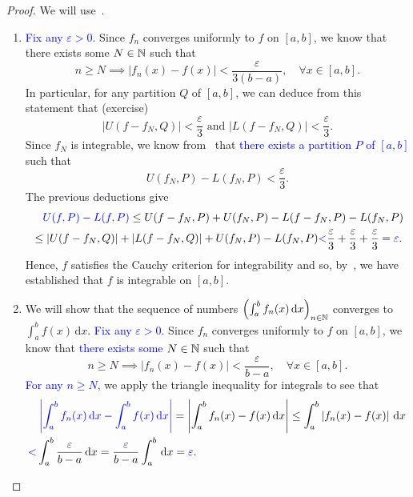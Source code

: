 \begin{proof}
	We will use~.
	\begin{enumerate}
		\item \textcolor{blue}{Fix any $\varepsilon>0$.} Since $f_n$ converges uniformly to $f$ on $[a,b]$, we know that there exists some $N\in\mathbb{N}$ such that
		\[
		n\ge N\implies |f_n(x) - f(x)|<\frac{\varepsilon}{3(b-a)},\quad \forall x\in[a,b].
		\]
		In particular, for any partition $Q$ of $[a,b]$, we can deduce from this statement that (exercise)
		\[
		\left|U(f-f_N,Q)\right| < \frac{\varepsilon}{3}\text{ and }\left|L(f-f_N,Q)\right| < \frac{\varepsilon}{3}.
		\]
		Since $f_N$ is integrable, we know from~ that \textcolor{blue}{there exists a partition $P$ of $[a,b]$} such that
		\[
		U(f_N,P) - L(f_N,P)< \frac{\varepsilon}{3}.
		\]
		The previous deductions give
		\begin{align*}
			&\quad \textcolor{blue}{U(f,P)-L(f,P)} \le U(f-f_N,P) + U(f_N,P) - L(f-f_N,P) - L(f_N,P) \\
			&\le \left|U(f-f_N,Q)\right| +\left|L(f-f_N,Q)\right| + U(f_N,P) - L(f_N,P) \textcolor{blue}{<} \frac{\varepsilon}{3} + \frac{\varepsilon}{3} + \frac{\varepsilon}{3} = \textcolor{blue}{\varepsilon.} 
		\end{align*}
		Hence, $f$ satisfies the Cauchy criterion for integrability and so, by~, we have established that $f$ is integrable on $[a,b]$.
		\item We will show that the sequence of numbers $\left(\int_a^bf_n(x)\,\mathrm{d}x\right)_{n\in\mathbb{N}}$ converges to $\int_a^b f(x)\,\mathrm{d}x$. \textcolor{blue}{Fix any $\varepsilon>0$.} Since $f_n$ converges uniformly to $f$ on $[a,b]$, we know that \textcolor{blue}{there exists some $N\in\mathbb{N}$} such that
		\[
		n\ge N\implies |f_n(x) - f(x)|<\frac{\varepsilon}{b-a},\quad\forall x\in[a,b].
		\]
		\textcolor{blue}{For any $n\ge N$, }we apply the triangle inequality for integrals to see that
		\begin{align*}
			&\quad \textcolor{blue}{\left|\int_a^b f_n(x)\,\mathrm{d}x - \int_a^b f(x)\,\mathrm{d}x\right|} = \left|\int_a^bf_n(x) - f(x)\,\mathrm{d}x\right| \le \int_a^b\left|f_n(x) - f(x)\right| \,\mathrm{d}x \\
			&\textcolor{blue}{<}\int_a^b\frac{\varepsilon}{b-a}\,\mathrm{d}x = \frac{\varepsilon}{b-a}\int_a^b\,\mathrm{d}x = \textcolor{blue}{\varepsilon}.
		\end{align*}
	\end{enumerate}
\end{proof}